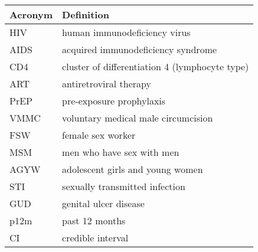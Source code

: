 \begin{tabular}{ll}
  \toprule
  Acronym & Definition \\
  \midrule
  HIV  & human immunodeficiency virus \\
  AIDS & acquired immunodeficiency syndrome \\
  CD4  & cluster of differentiation 4 (lymphocyte type) \\
  ART  & antiretroviral therapy \\
  PrEP & pre-exposure prophylaxis \\
  VMMC & voluntary medical male circumcision \\
  FSW  & female sex worker \\
  MSM  & men who have sex with men \\
  AGYW & adolescent girls and young women \\
  STI  & sexually transmitted infection \\
  GUD  & genital ulcer disease \\
  p12m & past 12 months \\
  CI   & credible interval \\
  \bottomrule
\end{tabular}